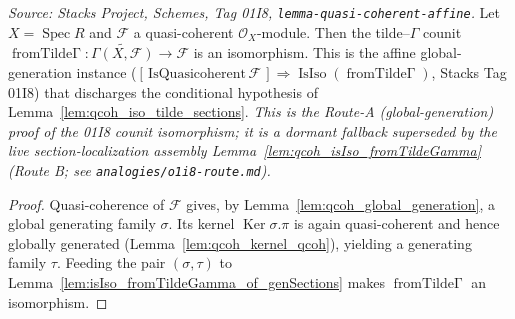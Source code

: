 \begin{lemma}
  \label{lem:isIso_fromTildeGamma_of_quasicoherent}
  \textit{Source: Stacks Project, Schemes, Tag 01I8,
  \texttt{lemma-quasi-coherent-affine}.}
  Let \(X = \operatorname{Spec} R\) and \(\mathcal{F}\) a quasi-coherent
  \(\mathcal{O}_X\)-module. Then the tilde--\(\Gamma\) counit
  \(\operatorname{fromTilde\Gamma} : \widetilde{\Gamma(X, \mathcal{F})} \to \mathcal{F}\)
  is an isomorphism. This is the affine global-generation instance
  (\([{\,}\mathrm{IsQuasicoherent}\,\mathcal{F}{\,}] \Rightarrow
  \operatorname{IsIso}(\operatorname{fromTilde\Gamma})\), Stacks Tag 01I8) that
  discharges the conditional hypothesis of Lemma~\ref{lem:qcoh_iso_tilde_sections}.
  \emph{This is the Route-A (global-generation) proof of the 01I8 counit isomorphism; it is a
  dormant fallback superseded by the live section-localization assembly
  Lemma~\ref{lem:qcoh_isIso_fromTildeGamma} (Route B; see \texttt{analogies/o1i8-route.md}).}
\end{lemma}
\begin{proof}
  Quasi-coherence of \(\mathcal{F}\) gives, by Lemma~\ref{lem:qcoh_global_generation}, a
  global generating family \(\sigma\). Its kernel \(\operatorname{Ker} \sigma.\pi\) is
  again quasi-coherent and hence globally generated
  (Lemma~\ref{lem:qcoh_kernel_qcoh}), yielding a generating family \(\tau\). Feeding the
  pair \((\sigma, \tau)\) to Lemma~\ref{lem:isIso_fromTildeGamma_of_genSections} makes
  \(\operatorname{fromTilde\Gamma}\) an isomorphism.
\end{proof}

